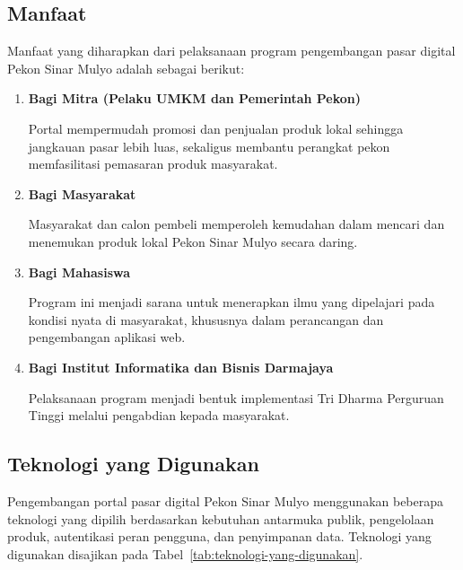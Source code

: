 \documentclass[12pt,a4paper]{article}
\begin{document}

\subsection{Manfaat}

Manfaat yang diharapkan dari pelaksanaan program pengembangan pasar
digital Pekon Sinar Mulyo adalah sebagai berikut:

\begin{enumerate}[
    leftmargin=1.25cm,
    label=\alph*.,
    itemsep=0pt,
    topsep=0.2cm
]

    \item \textbf{Bagi Mitra (Pelaku UMKM dan Pemerintah Pekon)}

    Portal mempermudah promosi dan penjualan produk lokal sehingga
    jangkauan pasar lebih luas, sekaligus membantu perangkat pekon
    memfasilitasi pemasaran produk masyarakat.

    \item \textbf{Bagi Masyarakat}

    Masyarakat dan calon pembeli memperoleh kemudahan dalam mencari
    dan menemukan produk lokal Pekon Sinar Mulyo secara daring.

    \item \textbf{Bagi Mahasiswa}

    Program ini menjadi sarana untuk menerapkan ilmu yang dipelajari
    pada kondisi nyata di masyarakat, khususnya dalam perancangan dan
    pengembangan aplikasi web.

    \item \textbf{Bagi Institut Informatika dan Bisnis Darmajaya}

    Pelaksanaan program menjadi bentuk implementasi Tri Dharma
    Perguruan Tinggi melalui pengabdian kepada masyarakat.

\end{enumerate}


\subsection{Teknologi yang Digunakan}

Pengembangan portal pasar digital Pekon Sinar Mulyo menggunakan
beberapa teknologi yang dipilih berdasarkan kebutuhan antarmuka
publik, pengelolaan produk, autentikasi peran pengguna, dan
penyimpanan data. Teknologi yang digunakan disajikan pada
Tabel~\ref{tab:teknologi-yang-digunakan}.
\end{document}
